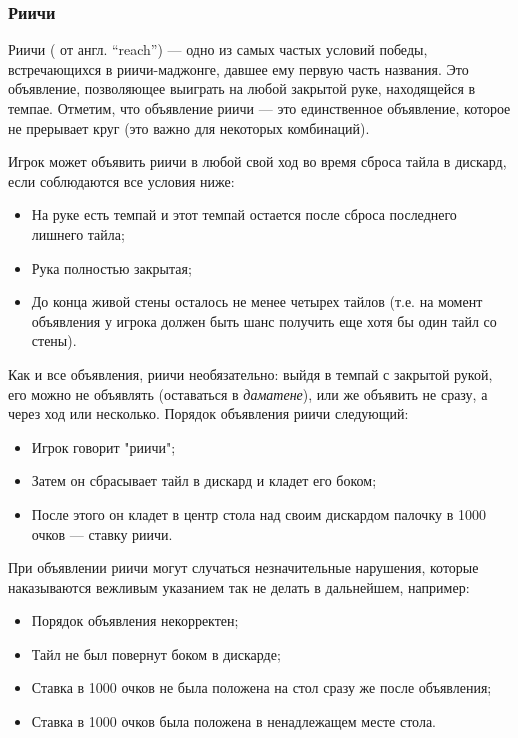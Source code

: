 \subsubsection{Риичи}

Риичи ( от англ. “reach”) --- одно из самых частых условий победы, встречающихся в риичи-маджонге, давшее ему первую часть названия. Это объявление, позволяющее выиграть на любой закрытой руке, находящейся в темпае. Отметим, что объявление риичи --- это единственное объявление, которое не прерывает круг (это важно для некоторых комбинаций).

Игрок может объявить риичи в любой свой ход во время сброса тайла в дискард, если соблюдаются все условия ниже:

\begin{itemize}
	\item На руке есть темпай и этот темпай остается после сброса последнего лишнего тайла;
	\item Рука полностью закрытая;
	\item До конца живой стены осталось не менее четырех тайлов (т.е. на момент объявления у игрока должен быть шанс получить еще хотя бы один тайл со стены).
\end{itemize}

Как и все объявления, риичи необязательно: выйдя в темпай с закрытой рукой, его можно не объявлять (оставаться в \textit{даматене}), или же объявить не сразу, а через ход или несколько. Порядок объявления риичи следующий:

\begin{itemize}
	\item Игрок говорит "риичи";
	\item Затем он сбрасывает тайл в дискард и кладет его боком;
	\item После этого он кладет в центр стола над своим дискардом палочку в 1000 очков --- ставку риичи.
\end{itemize}

При объявлении риичи могут случаться незначительные нарушения, которые наказываются вежливым указанием так не делать в дальнейшем, например:
\begin{itemize}
	\item Порядок объявления некорректен;
	\item Тайл не был повернут боком в дискарде;
	\item Ставка в 1000 очков не была положена на стол сразу же после объявления;
	\item Ставка в 1000 очков была положена в ненадлежащем месте стола.
\end{itemize}

